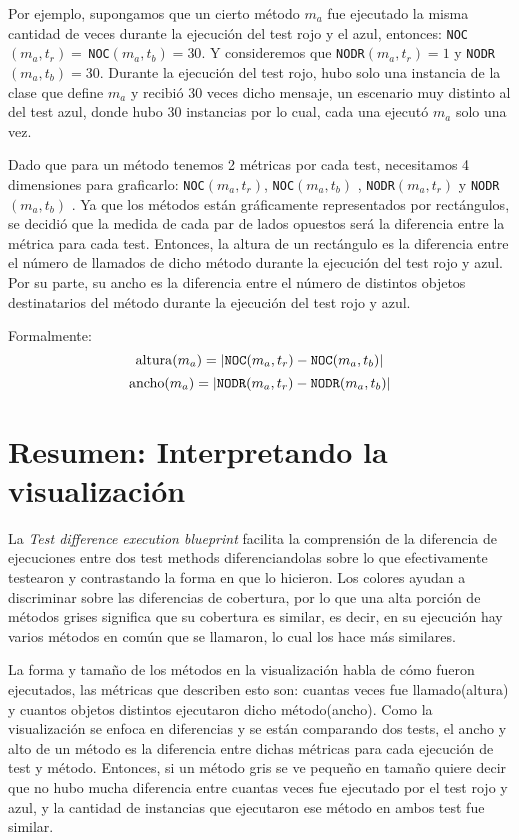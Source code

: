 \par Por ejemplo, supongamos que un cierto método $m_a$ fue ejecutado la misma cantidad de veces durante la ejecución del test rojo y el azul, entonces: {\tt NOC}$(m_a,t_r) = \,${\tt NOC}$(m_a,t_b) = 30$. Y consideremos que {\tt NODR}$(m_a,t_r) = 1$ y {\tt NODR}$(m_a,t_b) = 30$. Durante la ejecución del test rojo, hubo solo una instancia de la clase que define $m_a$ y recibió 30 veces dicho mensaje, un escenario muy distinto al del test azul, donde hubo 30 instancias por lo cual, cada una ejecutó $m_a$ solo una vez.

\par Dado que para un método tenemos 2 métricas por cada test, necesitamos 4 dimensiones para graficarlo: {\tt NOC}$(m_a,t_r)$, {\tt NOC}$(m_a,t_b)$ , {\tt NODR}$(m_a,t_r)$ y {\tt NODR}$(m_a,t_b)$ . Ya que los métodos están gráficamente representados por rectángulos, se decidió que la medida de cada par de lados opuestos será la diferencia entre la métrica para cada test. Entonces, la altura de un rectángulo es la diferencia entre el número de llamados de dicho método durante la ejecución del test rojo y azul. Por su parte, su ancho es la diferencia entre el número de distintos objetos destinatarios del método durante la ejecución del test rojo y azul. 

\par Formalmente:
\[ {\rm altura}(m_a) = \vert {\tt NOC}(m_a,t_r) - {\tt NOC}(m_a,t_b) \vert \]
\[ {\rm ancho}(m_a) = \vert {\tt NODR}(m_a,t_r) - {\tt NODR}(m_a,t_b) \vert \]


\section{Resumen: Interpretando la visualización}


\par La \emph{Test difference execution blueprint} facilita la comprensión de la diferencia de ejecuciones entre dos test methods diferenciandolas sobre lo que efectivamente testearon y contrastando la forma en que lo hicieron. Los colores ayudan a discriminar sobre las diferencias de cobertura, por lo que una alta porción de métodos grises significa que su cobertura es similar, es decir, en su ejecución hay varios métodos en común que se llamaron, lo cual los hace más similares.

\par La forma y tamaño de los métodos en la visualización habla de cómo fueron ejecutados, las métricas que describen esto son: cuantas veces fue llamado(altura) y cuantos objetos distintos ejecutaron dicho método(ancho). Como la visualización se enfoca en diferencias y se están comparando dos tests, el ancho y alto de un método es la diferencia entre dichas métricas para cada ejecución de test y método. Entonces, si un método gris se ve pequeño en tamaño quiere decir que no hubo mucha diferencia entre cuantas veces fue ejecutado por el test rojo y azul, y la cantidad de instancias que ejecutaron ese método en ambos test fue similar. 

